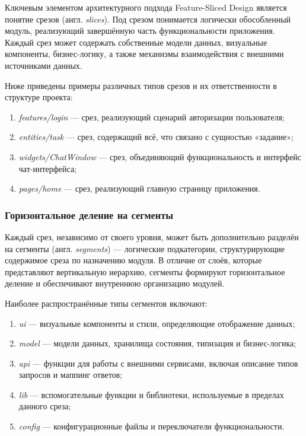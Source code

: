 Ключевым элементом архитектурного подхода Feature-Sliced Design является понятие срезов (англ. \textit{slices}). Под срезом понимается логически обособленный модуль, реализующий завершённую часть функциональности приложения. Каждый срез может содержать собственные модели данных, визуальные компоненты, бизнес-логику, а также механизмы взаимодействия с внешними источниками данных.

Ниже приведены примеры различных типов срезов и их ответственности в структуре проекта:

\begin{enumerate}
  \item \textit{features/login} — срез, реализующий сценарий авторизации пользователя;
  \item \textit{entities/task} — срез, содержащий всё, что связано с сущностью «задание»;
  \item \textit{widgets/ChatWindow} — срез, объединяющий функциональность и интерфейс чат-интерфейса;
  \item \textit{pages/home} — срез, реализующий главную страницу приложения.
\end{enumerate}

\subsubsection{Горизонтальное деление на сегменты}

Каждый срез, независимо от своего уровня, может быть дополнительно разделён на сегменты (англ. \textit{segments}) — логические подкатегории, структурирующие содержимое среза по назначению модуля. В отличие от слоёв, которые представляют вертикальную иерархию, сегменты формируют горизонтальное деление и обеспечивают внутреннюю организацию модулей.

Наиболее распространённые типы сегментов включают:
\begin{enumerate}
  \item \textit{ui} — визуальные компоненты и стили, определяющие отображение данных;
  \item \textit{model} — модели данных, хранилища состояния, типизация и бизнес-логика;
  \item \textit{api} — функции для работы с внешними сервисами, включая описание типов запросов и маппинг ответов;
  \item \textit{lib} — вспомогательные функции и библиотеки, используемые в пределах данного среза;
  \item \textit{config} — конфигурационные файлы и переключатели функциональности.
\end{enumerate}

